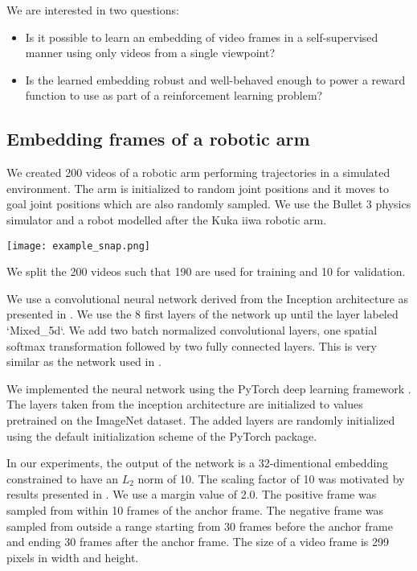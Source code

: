 
We are interested in two questions:
\begin{itemize}
\item Is it possible to learn an embedding of video frames in a self-supervised manner using only videos from a single viewpoint?
\item Is the learned embedding robust and well-behaved enough to power a reward function to use as part of a reinforcement learning problem?
\end{itemize}

\subsection{Embedding frames of a robotic arm}

We created 200 videos of a robotic arm performing trajectories in a simulated environment. The arm is initialized to random joint positions and it moves to goal joint positions which are also randomly sampled. We use the Bullet 3 physics simulator and a robot modelled after the Kuka iiwa robotic arm.

{
    \label{example-snap}
    \centering
    \texttt{[image: example\_snap.png]}
    \vspace{0.5cm}
}

We split the 200 videos such that 190 are used for training and 10 for validation.

We use a convolutional neural network derived from the Inception architecture as presented in \citep{inception-v3}. We use the 8 first layers of the network up until the layer labeled `Mixed\_5d`. We add two batch normalized convolutional layers, one spatial softmax transformation followed by two fully connected layers. This is very similar as the network used in \cite{self-supervised-learning}.

We implemented the neural network using the PyTorch deep learning framework \citep{pytorch}. The layers taken from the inception architecture are initialized to values pretrained on the ImageNet dataset. The added layers are randomly initialized using the default initialization scheme of the PyTorch package.

In our experiments, the output of the network is a 32-dimentional embedding constrained to have an $L_2$ norm of 10. The scaling factor of 10 was motivated by results presented in \cite{constrained-softmax-loss}. We use a margin value of 2.0. The positive frame was sampled from within 10 frames of the anchor frame. The negative frame was sampled from outside a range starting from 30 frames before the anchor frame and ending 30 frames after the anchor frame. The size of a video frame is 299 pixels in width and height.


